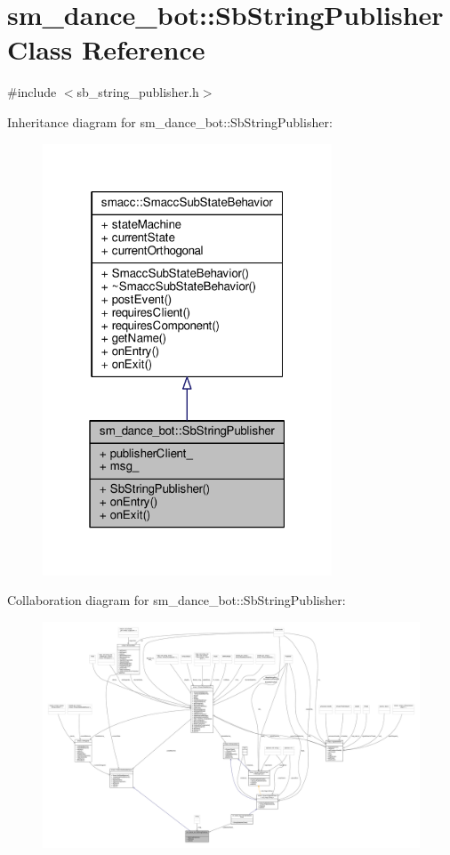 \hypertarget{classsm__dance__bot_1_1SbStringPublisher}{}\section{sm\+\_\+dance\+\_\+bot\+:\+:Sb\+String\+Publisher Class Reference}
\label{classsm__dance__bot_1_1SbStringPublisher}


{\ttfamily \#include $<$sb\+\_\+string\+\_\+publisher.\+h$>$}



Inheritance diagram for sm\+\_\+dance\+\_\+bot\+:\+:Sb\+String\+Publisher\+:
\nopagebreak
\begin{figure}[H]
\begin{center}
\leavevmode
\includegraphics[width=244pt]{classsm__dance__bot_1_1SbStringPublisher__inherit__graph}
\end{center}
\end{figure}


Collaboration diagram for sm\+\_\+dance\+\_\+bot\+:\+:Sb\+String\+Publisher\+:
\nopagebreak
\begin{figure}[H]
\begin{center}
\leavevmode
\includegraphics[width=350pt]{classsm__dance__bot_1_1SbStringPublisher__coll__graph}
\end{center}
\end{figure}
